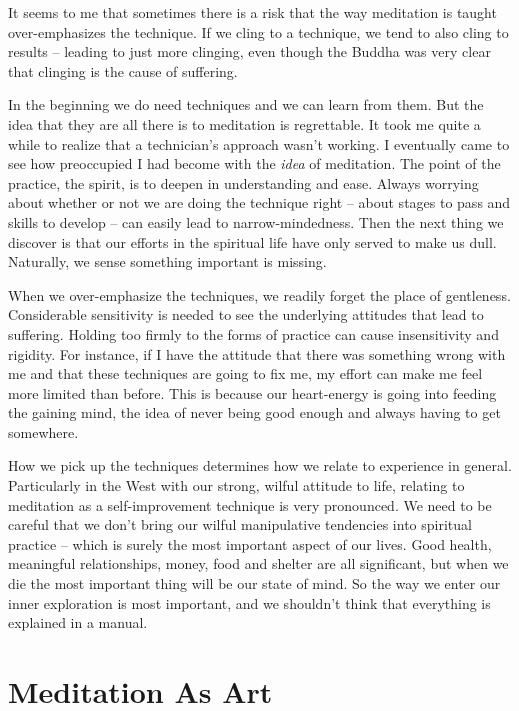 It seems to me that sometimes there is a risk that the way meditation is
taught over-emphasizes the technique. If we cling to a technique, we
tend to also cling to results – leading to just more clinging, even
though the Buddha was very clear that clinging is the cause of
suffering.

In the beginning we do need techniques and we can learn from them. But
the idea that they are all there is to meditation is regrettable. It
took me quite a while to realize that a technician’s approach wasn’t
working. I eventually came to see how preoccupied I had become with the
\emph{idea} of meditation. The point of the practice, the spirit, is to
deepen in understanding and ease. Always worrying about whether or not
we are doing the technique right – about stages to pass and skills to
develop – can easily lead to narrow-mindedness. Then the next thing we
discover is that our efforts in the spiritual life have only served to
make us dull. Naturally, we sense something important is missing.

When we over-emphasize the techniques, we readily forget the place of
gentleness. Considerable sensitivity is needed to see the underlying
attitudes that lead to suffering. Holding too firmly to the forms of
practice can cause insensitivity and rigidity. For instance, if I have
the attitude that there was something wrong with me and that these
techniques are going to fix me, my effort can make me feel more limited
than before. This is because our heart-energy is going into feeding the
gaining mind, the idea of never being good enough and always having to
get somewhere.

How we pick up the techniques determines how we relate to experience in
general. Particularly in the West with our strong, wilful attitude to
life, relating to meditation as a self-improvement technique is very
pronounced. We need to be careful that we don’t bring our wilful
manipulative tendencies into spiritual practice – which is surely the
most important aspect of our lives. Good health, meaningful
relationships, money, food and shelter are all significant, but when we
die the most important thing will be our state of mind. So the way we
enter our inner exploration is most important, and we shouldn’t think
that everything is explained in a manual.

\section{Meditation As Art}

